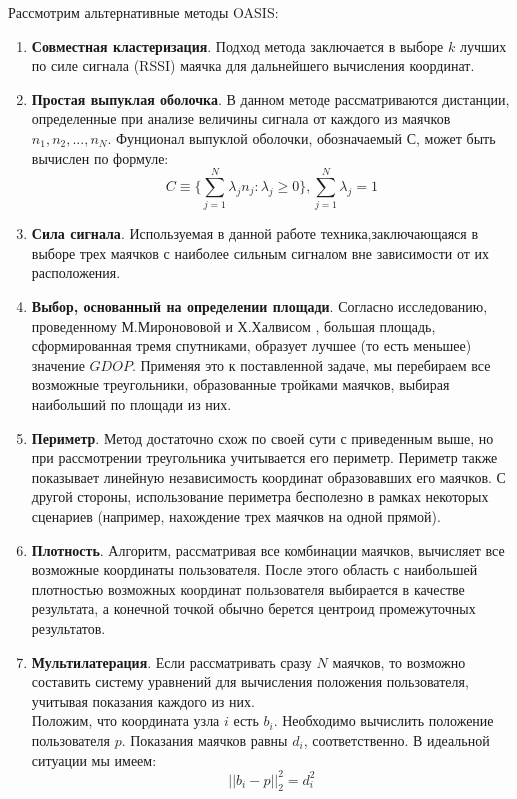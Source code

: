 Рассмотрим альтернативные методы OASIS:
\begin{enumerate}
    \item
    \textbf{Совместная кластеризация}. Подход метода заключается в выборе $k$ лучших по силе сигнала (RSSI) маячка для дальнейшего вычисления координат.
    \item
    \textbf{Простая выпуклая оболочка}. В данном методе рассматриваются дистанции, определенные при анализе величины сигнала от каждого из маячков $n_1, n_2, ..., n_N$. Фунционал выпуклой оболочки, обозначаемый С, может быть вычислен по формуле:
    \[
        C \equiv \{ \sum_{j=1}^N \lambda_j n_j : \lambda_j \geq 0 \}, \sum_{j=1}^N \lambda_j = 1
    \]
    \item
    \textbf{Сила сигнала}. Используемая в данной работе техника,заключающаяся в выборе трех маячков с наиболее сильным сигналом вне зависимости от их расположения.
    \item
    \textbf{Выбор, основанный на определении площади}. Согласно исследованию, проведенному М.Миронововой и Х.Халвисом \cite{mironovova2011calculation}, большая площадь, сформированная тремя спутниками, образует лучшее (то есть меньшее) значение $GDOP$. Применяя это к поставленной задаче, мы перебираем все возможные треугольники, образованные тройками маячков, выбирая наибольший по площади из них.
    \item
    \textbf{Периметр}. Метод достаточно схож по своей сути с приведенным выше, но при рассмотрении треугольника учитывается его периметр. Периметр также показывает линейную независимость координат образовавших его маячков. С другой стороны, использование периметра бесполезно в рамках некоторых сценариев (например, нахождение трех маячков на одной прямой).
    \item
    \textbf{Плотность}. Алгоритм, рассматривая все комбинации маячков, вычисляет все возможные координаты пользователя. После этого область с наибольшей плотностью возможных координат пользователя выбирается в качестве результата, а конечной точкой обычно берется центроид промежуточных результатов.
    \item
    \textbf{Мультилатерация}. Если рассматривать сразу $N$ маячков, то возможно составить систему уравнений для вычисления положения пользователя, учитывая показания каждого из них. \\
    Положим, что координата узла $i$ есть $b_i$. Необходимо вычислить положение пользователя $p$. Показания маячков равны $d_i$, соответственно. В идеальной ситуации мы имеем:
    \[
        || b_i - p ||^2_2=d_i^2
\]
\end{enumerate}
